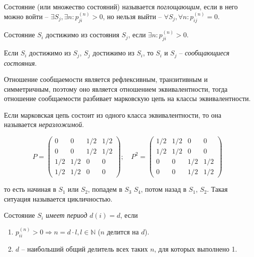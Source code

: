 \begin{definition}
  Состояние (или множество состояний) называется \emph{поглощающим}, если в него можно войти --
  $\exists S_j , \exists n : p_{ji}^{(n)} > 0$,
  но нельзя выйти --
  $\forall S_j, \forall n : p_{ij}^{(n)} = 0$.
\end{definition}

\begin{definition}
  Состояние $S_i$ достижимо из состояния $S_j$, если $\exists n : p_{ji}^{(n)} > 0$.
\end{definition}

\begin{definition}
  Если $S_i$ достижимо из $S_j$, $S_j$ достижимо из $S_i$, то $S_i$ и $S_j$ -- \emph{сообщающиеся
  состояния}.
\end{definition}

Отношение сообщаемости является рефлексивным, транзитивным и симметричным, поэтому оно является 
отношением эквивалентности, тогда отношение сообщаемости разбивает марковскую цепь на классы эквивалентности.

\begin{definition}
  Если марковская цепь состоит из одного класса эквивалентности, то она называется
  \emph{неразложимой}.
\end{definition}

\begin{ex}
  \[
    P = \begin{pmatrix}
      0 & 0 & 1/2 & 1/2 \\
      0 & 0 & 1/2 & 1/2 \\
      1/2 & 1/2 & 0 & 0 \\
      1/2 & 1/2 & 0 & 0
    \end{pmatrix}; \quad
    P^2 = \begin{pmatrix}
      1/2 & 1/2 & 0 & 0 \\
      1/2 & 1/2 & 0 & 0 \\
      0 & 0 & 1/2 & 1/2 \\
      0 & 0 & 1/2 & 1/2
    \end{pmatrix} 
  \]

  то есть начиная в $S_1$ или $S_2$, попадем в $S_3$ $S_4$, потом назад в $S_1$, $S_2$.
  Такая ситуация называется цикличностью.
\end{ex}

\begin{definition}
  Состояние $S_i$ \emph{имеет период $d(i) = d$}, если
  \begin{enumerate}
    \item $p_{ii}^{(n)} > 0 \Rightarrow n = d \cdot l, l \in \mathbb{N}$ ($n$ делится на $d$).
    \item $d$ -- наибольший общий делитель всех таких $n$, для которых выполнено 1.
  \end{enumerate}
\end{definition}

